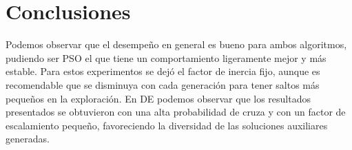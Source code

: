 \documentclass[letterpaper,12pt]{article}
\theoremstyle{definition}
\begin{document}
\section{Conclusiones}

Podemos observar que el desempeño en general es bueno para ambos algoritmos, pudiendo ser PSO el que tiene un comportamiento ligeramente mejor y más estable. Para estos experimentos se dejó el factor de inercia fijo, aunque es recomendable que se disminuya con cada generación para tener saltos más pequeños en la exploración. En DE podemos observar que los resultados presentados se obtuvieron con una alta probabilidad de cruza y con un factor de escalamiento pequeño, favoreciendo la diversidad de las soluciones auxiliares generadas.
\end{document}
